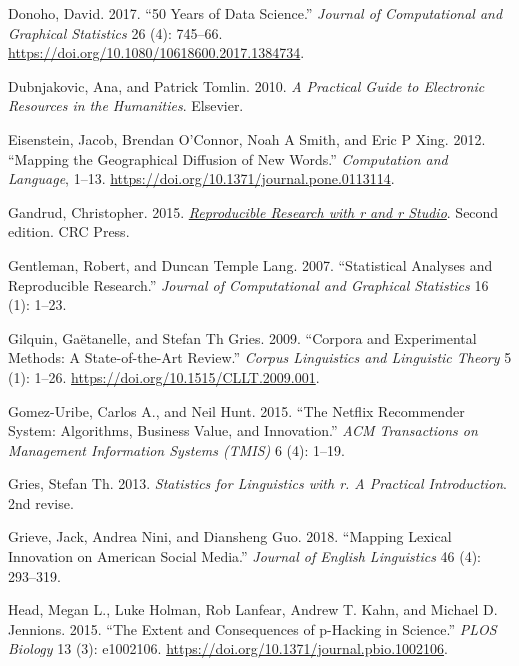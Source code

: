 \documentclass[
  letterpaper,
]{latex/krantz}
\newlength{\cslhangindent}
\newlength{\cslentryspacingunit} %
\newenvironment{CSLReferences}[2] %
 {%
  \setlength{\parindent}{0pt}
  \ifodd #1
  \let\oldpar\par
  \def\par{\hangindent=\cslhangindent\oldpar}
  \fi
  \setlength{\parskip}{#2\cslentryspacingunit}
 }%
 {}
\begin{document}
\begin{CSLReferences}{1}{0}
\leavevmode{}%
Donoho, David. 2017. {``50 Years of Data Science.''} \emph{Journal of
Computational and Graphical Statistics} 26 (4): 745--66.
\url{https://doi.org/10.1080/10618600.2017.1384734}.

\leavevmode{}%
Dubnjakovic, Ana, and Patrick Tomlin. 2010. \emph{A Practical Guide to
Electronic Resources in the Humanities}. Elsevier.

\leavevmode{}%
Eisenstein, Jacob, Brendan O'Connor, Noah A Smith, and Eric P Xing.
2012. {``Mapping the Geographical Diffusion of New Words.''}
\emph{Computation and Language}, 1--13.
\url{https://doi.org/10.1371/journal.pone.0113114}.

\leavevmode{}%
Gandrud, Christopher. 2015.
\emph{\href{https://www.ncbi.nlm.nih.gov/pubmed/17811671}{Reproducible
Research with r and r Studio}}. Second edition. CRC Press.

\leavevmode{}%
Gentleman, Robert, and Duncan Temple Lang. 2007. {``Statistical Analyses
and Reproducible Research.''} \emph{Journal of Computational and
Graphical Statistics} 16 (1): 1--23.

\leavevmode{}%
Gilquin, Gaëtanelle, and Stefan Th Gries. 2009. {``Corpora and
Experimental Methods: A State-of-the-Art Review.''} \emph{Corpus
Linguistics and Linguistic Theory} 5 (1): 1--26.
\url{https://doi.org/10.1515/CLLT.2009.001}.

\leavevmode{}%
Gomez-Uribe, Carlos A., and Neil Hunt. 2015. {``The Netflix Recommender
System: Algorithms, Business Value, and Innovation.''} \emph{ACM
Transactions on Management Information Systems (TMIS)} 6 (4): 1--19.

\leavevmode{}%
Gries, Stefan Th. 2013. \emph{Statistics for Linguistics with r. A
Practical Introduction}. 2nd revise.

\leavevmode{}%
Grieve, Jack, Andrea Nini, and Diansheng Guo. 2018. {``Mapping Lexical
Innovation on American Social Media.''} \emph{Journal of English
Linguistics} 46 (4): 293--319.

\leavevmode{}%
Head, Megan L., Luke Holman, Rob Lanfear, Andrew T. Kahn, and Michael D.
Jennions. 2015. {``The Extent and Consequences of p-Hacking in
Science.''} \emph{PLOS Biology} 13 (3): e1002106.
\url{https://doi.org/10.1371/journal.pbio.1002106}.


\end{CSLReferences}
\end{document}

